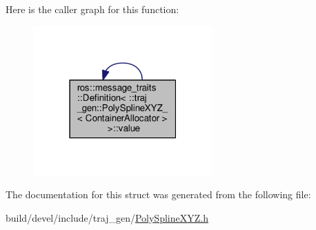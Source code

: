 Here is the caller graph for this function\+:
\nopagebreak
\begin{figure}[H]
\begin{center}
\leavevmode
\includegraphics[width=195pt]{structros_1_1message__traits_1_1_definition_3_01_1_1traj__gen_1_1_poly_spline_x_y_z___3_01_container_allocator_01_4_01_4_a87aa9969b0ea4241060c614e9b9231a7_icgraph}
\end{center}
\end{figure}




The documentation for this struct was generated from the following file\+:\begin{DoxyCompactItemize}
\item 
build/devel/include/traj\+\_\+gen/\hyperlink{_poly_spline_x_y_z_8h}{Poly\+Spline\+X\+Y\+Z.\+h}\end{DoxyCompactItemize}
